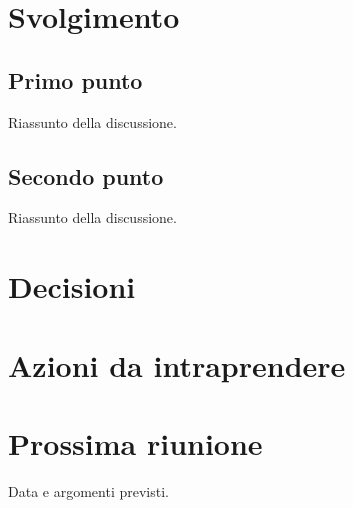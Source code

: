 \section{Svolgimento}
\subsection{Primo punto}
Riassunto della discussione.

\subsection{Secondo punto}
Riassunto della discussione.  

\section{Decisioni}
\begin{decisioni}
\end{decisioni}

\section{Azioni da intraprendere}
\begin{azioni}
\end{azioni}

\section{Prossima riunione}
Data e argomenti previsti.


